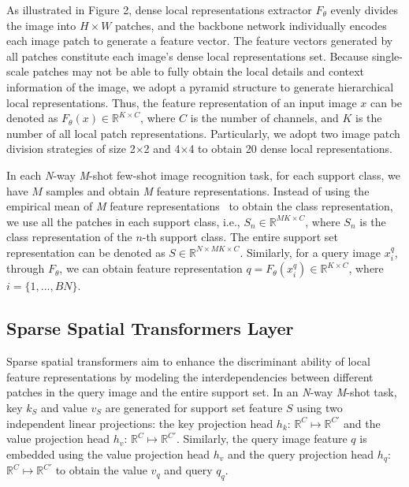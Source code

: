 \documentclass{SCIS2019}
\begin{document}
As illustrated in Figure 2, dense local representations extractor $F_{\theta}$ evenly divides the image into $H\times W$ patches, and the backbone network individually encodes each image patch to generate a feature vector. The feature vectors generated by all patches constitute each image's dense local representations set. Because single-scale patches may not be able to fully obtain the local details and context information of the image, we adopt a pyramid structure to generate hierarchical local representations. Thus, the feature representation of an input image $x$ can be denoted as $F_{\theta}(x) \in \mathbb{R}^{K \times C}$, where $C$ is the number of channels, and $K$ is the number of all local patch representations. Particularly, we adopt two image patch division strategies of size 2$\times$2 and 4$\times$4 to obtain 20 dense local representations.

In each \emph{N}-way \emph{M}-shot few-shot image recognition task, for each support class, we have $M$ samples and obtain \emph{M} feature representations. Instead of using the empirical mean of \emph{M} feature representations~\cite{7} to obtain the class representation, we use all the patches in each support class, i.e., $S_n\in\mathbb{R}^{MK\times C}$,
where $S_n$ is the class representation of the $n$-th support class. The entire support set representation can be denoted as $S\in \mathbb{R}^{N\times MK \times C}$. Similarly, for a query image $x_i^q$, through $F_{\theta}$, we can obtain feature representation $q = F_{\theta}(x_i^q)\in\mathbb{R}^{K \times C}$, where $i=\{1,...,BN\}$.

\subsection{Sparse Spatial Transformers Layer}
Sparse spatial transformers aim to enhance the discriminant ability of local feature representations by modeling the interdependencies between different patches in the query image and the entire support set. In an \emph{N}-way \emph{M}-shot task, key $k_S$ and value $v_S$ are generated for support set feature $S$ using two independent linear projections: the key projection head $h_k$: $\mathbb{R}^C \mapsto \mathbb{R}^{C'}$ and the value projection head $h_v$: $\mathbb{R}^C \mapsto \mathbb{R}^{C'}$. Similarly, the query image feature $q$ is embedded using the value projection head $h_v$ and the query projection head $h_q$: $\mathbb{R}^C \mapsto \mathbb{R}^{C'}$ to obtain the value $v_q$ and query $q_q$.
\end{document}
